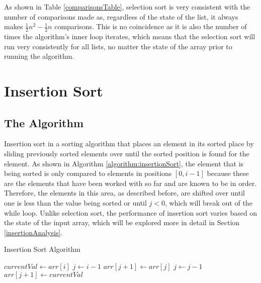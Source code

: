 \documentclass[letterpaper, 10pt,DIV=13]{scrartcl}
\numberwithin{equation}{section} %
\numberwithin{figure}{section} %
\numberwithin{table}{section} %
\begin{document}
As shown in Table \ref{comparisonsTable}, selection sort is very consistent with the number of comparisons made as, regardless of the state of the list, it always makes $\frac{1}{2}n^2 - \frac{1}{2}n$ comparisons. This is no coincidence as it is also the number of times the algorithm's inner loop iterates, which means that the selection sort will run very consistently for all lists, no matter the state of the array prior to running the algorithm.

\section{Insertion Sort}\label{insertionSortSection}
\subsection{The Algorithm}\label{insertionSortAlgo}
Insertion sort in a sorting algorithm that places an element in its sorted place by sliding previously sorted elements over until the sorted position is found for the element. As shown in Algorithm \ref{algorithm:insertionSort}, the element that is being sorted is only compared to elements in positions $[0, i - 1]$ because these are the elements that have been worked with so far and are known to be in order. Therefore, the elements in this area, as described before, are shifted over until one is less than the value being sorted or until $j < 0$, which will break out of the while loop. Unlike selection sort, the performance of insertion sort varies based on the state of the input array, which will be explored more in detail in Section \ref{insertionAnalysis}.

\begin{algorithm}
  \caption{Insertion Sort Algorithm}
  \label{algorithm:insertionSort}
  \begin{algorithmic}[1]
         
          \State $currentVal \gets arr[i]$
          \State $j \gets i - 1$
           
            \State $arr[j + 1] \gets arr[j]$ 
            \State $j \gets j - 1$
          \EndWhile
          \State $arr[j + 1] \gets currentVal$ 
        \EndFor
      \EndProcedure
  \end{algorithmic}
\end{algorithm}
\end{document}

